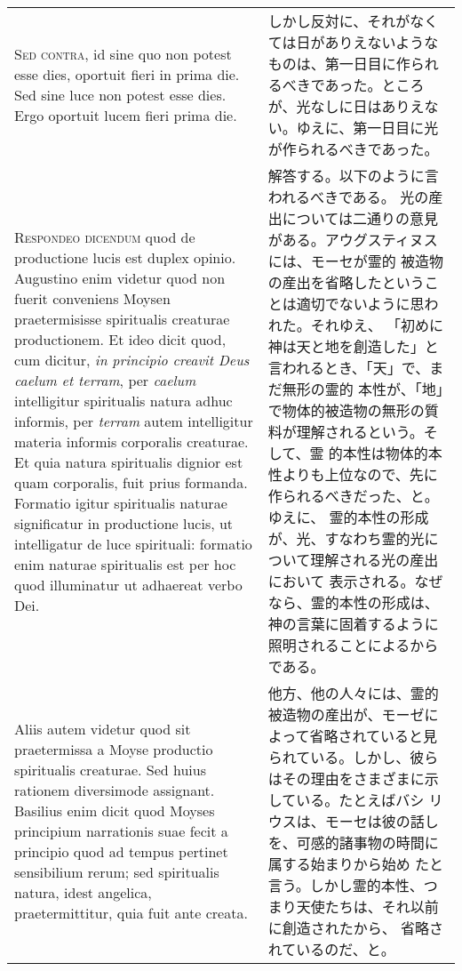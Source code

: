 \documentclass[10pt]{jsarticle} %
\begin{document}
\begin{longtable}{p{21em}p{21em}}
\\


{\scshape  Sed contra}, id sine quo non potest esse
dies, oportuit fieri in prima die. Sed sine luce non potest esse
dies. Ergo oportuit lucem fieri prima die.

&

しかし反対に、それがなくては日がありえないようなものは、第一日目に作られ
 るべきであった。ところが、光なしに日はありえない。ゆえに、第一日目に光
 が作られるべきであった。

\\


{\scshape Respondeo dicendum} quod de productione lucis
est duplex opinio. Augustino enim videtur quod non fuerit conveniens
Moysen praetermisisse spiritualis creaturae productionem. Et ideo dicit
quod, cum dicitur, {\itshape in principio creavit Deus caelum et terram}, per
{\itshape caelum} intelligitur spiritualis natura adhuc informis, per {\itshape terram} autem
intelligitur materia informis corporalis creaturae. Et quia natura
spiritualis dignior est quam corporalis, fuit prius formanda. Formatio
igitur spiritualis naturae significatur in productione lucis, ut
intelligatur de luce spirituali: formatio enim naturae spiritualis est
per hoc quod illuminatur ut adhaereat verbo Dei. 


&

解答する。以下のように言われるべきである。
光の産出については二通りの意見がある。アウグスティヌスには、モーセが霊的
 被造物の産出を省略したということは適切でないように思われた。それゆえ、
 「初めに神は天と地を創造した」と言われるとき、「天」で、まだ無形の霊的
 本性が、「地」で物体的被造物の無形の質料が理解されるという。そして、霊
 的本性は物体的本性よりも上位なので、先に作られるべきだった、と。ゆえに、
 霊的本性の形成が、光、すなわち霊的光について理解される光の産出において
 表示される。なぜなら、霊的本性の形成は、神の言葉に固着するように照明されることによるからである。


\\



Aliis autem videtur
quod sit praetermissa a Moyse productio spiritualis creaturae. Sed huius
rationem diversimode assignant. Basilius enim dicit quod Moyses
principium narrationis suae fecit a principio quod ad tempus pertinet
sensibilium rerum; sed spiritualis natura, idest angelica,
praetermittitur, quia fuit ante creata. 

&

他方、他の人々には、霊的被造物の産出が、モーゼによって省略されていると見
 られている。しかし、彼らはその理由をさまざまに示している。たとえばバシ
 リウスは、モーセは彼の話しを、可感的諸事物の時間に属する始まりから始め
 たと言う。しかし霊的本性、つまり天使たちは、それ以前に創造されたから、
 省略されているのだ、と。



\end{longtable}
\end{document}
